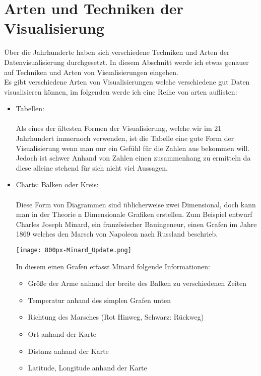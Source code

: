 \section{Arten und Techniken der Visualisierung}
Über die Jahrhunderte haben sich verschiedene Techniken und Arten der Datenvisualisierung durchgesetzt. In diesem Abschnitt werde ich etwas
genauer auf Techniken und Arten von Visualisierungen eingehen. \\
Es gibt verschiedene Arten von Visualisierungen welche verschiedene gut Daten visualisieren können, im folgenden werde ich eine Reihe von
arten auflisten:
\begin{itemize}
    \item{Tabellen:} \\ \\
        Als eines der ältesten Formen der Visualisierung, welche wir im 21 Jahrhundert immernoch verwenden, ist die Tabelle eine gute Form der
        Visualisierung wenn man nur ein Gefühl für die Zahlen aus  bekommen will. Jedoch ist schwer Anhand von Zahlen einen zusammenhang zu
        ermitteln da diese alleine stehend für sich nicht viel Aussagen.
    \item{Charts: Balken oder Kreis: } \\ \\
        Diese Form von Diagrammen sind üblicherweise zwei Dimensional, doch kann man in der Theorie n Dimensionale Grafiken erstellen. Zum
        Beispiel entwurf Charles Joseph Minard, ein französischer Bauingeneur, einen Grafen im Jahre 1869 welches den Marsch von Napoleon
        nach Russland beschrieb.\cite{bestvisualizations}
        \begin{center}
            \texttt{[image: 800px-Minard\_Update.png]}\cite{minardgraph}
        \end{center}
        In diesem einen Grafen erfasst Minard folgende Informationen:
        \begin{itemize}
            \item Größe der Arme anhand der breite des Balken zu verschiedenen Zeiten
            \item Temperatur anhand des simplen Grafen unten
            \item Richtung des Marsches (Rot Hinweg, Schwarz: Rückweg) 
            \item Ort anhand der Karte
            \item Distanz anhand der Karte
            \item Latitude, Longitude anhand der Karte

\end{itemize}
\end{itemize}
